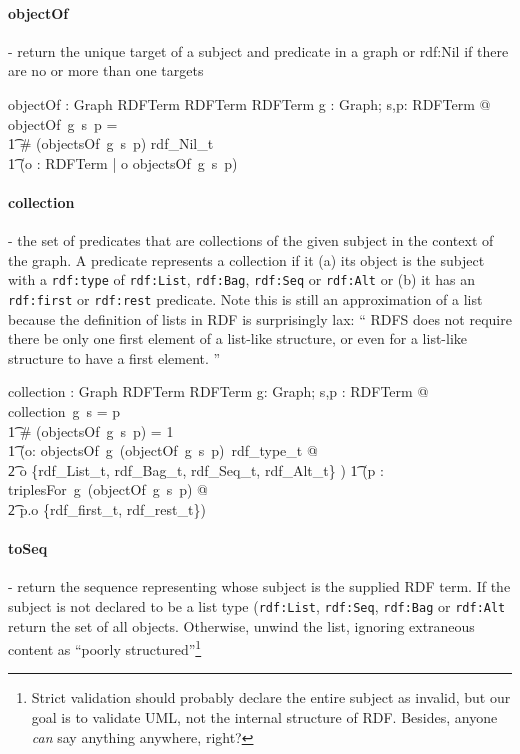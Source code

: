 \documentclass{article}
\def\uri#1{{\tt #1}}
\begin{document}
\paragraph{\textbf{objectOf} }- return the unique target of a subject and predicate in a graph or rdf:Nil if there are no or more than one targets
\begin{gendef}
  objectOf : Graph \pfun RDFTerm \pfun RDFTerm \pfun RDFTerm
\where
  \forall g : Graph; s,p: RDFTerm @ objectOf~g~s~p = \\
\t1    \IF \# (objectsOf~g~s~p)  \THEN rdf\_Nil\_t \ELSE \\
\t1   (\mu o : RDFTerm | o \in objectsOf~g~s~p)
\end{gendef}

\paragraph{\textbf{collection}}- the set of predicates that are collections of the given subject in the context of the graph.  A predicate represents a collection if
it (a) its object is the subject with a \uri{rdf:type} of \uri{rdf:List}, \uri{rdf:Bag}, \uri{rdf:Seq} or \uri{rdf:Alt} or
(b) it has an \uri{rdf:first} or \uri{rdf:rest} predicate.  Note this is still an approximation of a list because the definition of lists in RDF is surprisingly lax: `` RDFS does not require there be only one first element of a list-like structure, or even for a list-like structure to have a first element. ''\cite{rdfschema}
 
\begin{gendef}
    collection : Graph \pfun RDFTerm \pfun RDFTerm 
\where
    \forall g: Graph; s,p : RDFTerm @ collection~g~s = p \iff \\
\t1 \# (objectsOf~g~s~p) = 1 \land \\
\t1 (\exists o: objectsOf~g~(objectOf~g~s~p)~rdf\_type\_t @ \\
\t2 o \in \{rdf\_List\_t, rdf\_Bag\_t, rdf\_Seq\_t, rdf\_Alt\_t\} ) \lor 
\also
\t1 (\exists p : triplesFor~g~(objectOf~g~s~p) @ \\
\t2 p.o \in \{rdf\_first\_t, rdf\_rest\_t\})
\end{gendef}
 

\paragraph{\textbf{toSeq}} - return the sequence representing whose subject is the supplied RDF term.  If the subject is not declared to be a list type
(\uri{rdf:List}, \uri{rdf:Seq}, \uri{rdf:Bag} or \uri{rdf:Alt} return 
the set of all objects. Otherwise, unwind the list, ignoring extraneous content as ``poorly structured''\footnote{Strict validation should probably declare the entire subject as
invalid, but our goal is to validate UML, not the internal structure of RDF.  Besides, anyone \emph{can} say anything anywhere, right?}
\end{document}
